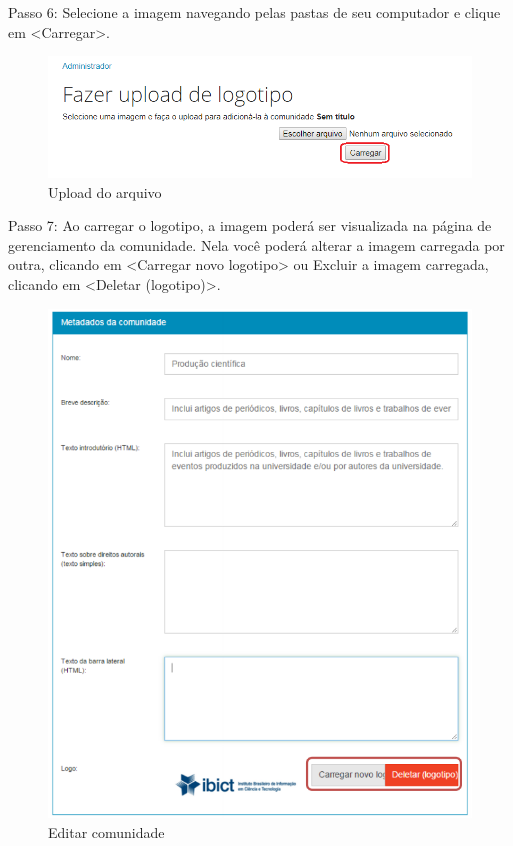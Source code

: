 \documentclass[12pt,hidelinks]{article}
\begin{document}
\newpage
    Passo 6: Selecione a imagem navegando pelas pastas de seu computador e clique em <Carregar>.
    
    \begin{figure}[!htp]
                \centering
                \includegraphics[scale=0.8]{figura/Figura15.png}
                \caption{Upload do arquivo}
            \label{Rotulo}
        \end{figure}
        
    Passo 7: Ao carregar o logotipo, a imagem poderá ser visualizada na página de gerenciamento da comunidade. Nela você poderá alterar a imagem carregada por outra, clicando em <Carregar novo logotipo> ou Excluir a imagem carregada, clicando em <Deletar (logotipo)>.
    
    \begin{figure}[!htp]
                \centering
                \includegraphics[scale=0.7]{figura/Figura16.png}
                \caption{Editar comunidade}
            \label{Rotulo}
        \end{figure}
        
\end{document}
